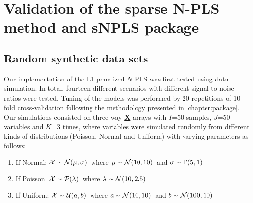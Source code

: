 
\chapter[Validation of the sparse N-PLS method and sNPLS package]{Validation of the sparse N-PLS method and sNPLS package}



\section{Random synthetic data sets}
Our implementation of the L1 penalized $N$-PLS was first tested using data simulation. In total, fourteen different scenarios with different signal-to-noise ratios were tested. Tuning of the models was performed by 20 repetitions of 10-fold cross-validation following the methodology presented in \autoref{chapter:package}. Our simulations consisted on three-way \textbf{\underline{X}} arrays with $I$=50 samples, $J$=50 variables and $K$=3 times, where variables were simulated randomly from different kinds of distributions (Poisson, Normal and Uniform) with varying parameters as follows:

\vspace{15pt}
\begin{enumerate}
    \item If Normal: $\mathcal{X}\ {\raise.17ex\hbox{$\scriptstyle\sim$}}\ \mathcal{N}(\mu, \sigma)$\ where $\mu\ {\raise.17ex\hbox{$\scriptstyle\sim$}}\ \mathcal{N}(10, 10)$\ and $\sigma\ {\raise.17ex\hbox{$\scriptstyle\sim$}}\ \Gamma(5, 1)$
    \item If Poisson: $\mathcal{X}\ {\raise.17ex\hbox{$\scriptstyle\sim$}}\ \mathcal{P}(\lambda)$\ where $\lambda\ {\raise.17ex\hbox{$\scriptstyle\sim$}}\ \mathcal{N}(10, 2.5)$
    \item If Uniform: $\mathcal{X}\ {\raise.17ex\hbox{$\scriptstyle\sim$}}\ \mathcal{U}(a, b)$\ where $a\ {\raise.17ex\hbox{$\scriptstyle\sim$}}\ \mathcal{N}(10, 10)$\ and $b\ {\raise.17ex\hbox{$\scriptstyle\sim$}}\ \mathcal{N}(100, 10)$
\end{enumerate}

